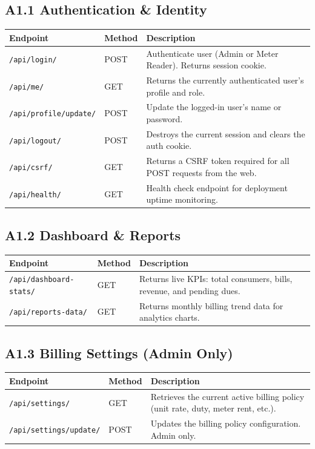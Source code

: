 \documentclass[12pt, a4paper, onecolumn]{report}
\begin{document}
\subsection*{A1.1 Authentication \& Identity}
\begin{tabularx}{\textwidth}{|p{5.2cm}|p{2.2cm}|X|}
\hline
\textbf{Endpoint} & \textbf{Method} & \textbf{Description} \\
\hline
\texttt{/api/login/} & POST & Authenticate user (Admin or Meter Reader). Returns session cookie. \\
\hline
\texttt{/api/me/} & GET & Returns the currently authenticated user's profile and role. \\
\hline
\texttt{/api/profile/update/} & POST & Update the logged-in user's name or password. \\
\hline
\texttt{/api/logout/} & POST & Destroys the current session and clears the auth cookie. \\
\hline
\texttt{/api/csrf/} & GET & Returns a CSRF token required for all POST requests from the web. \\
\hline
\texttt{/api/health/} & GET & Health check endpoint for deployment uptime monitoring. \\
\hline
\end{tabularx}

\vspace{0.8em}
\subsection*{A1.2 Dashboard \& Reports}
\begin{tabularx}{\textwidth}{|p{5.2cm}|p{2.2cm}|X|}
\hline
\textbf{Endpoint} & \textbf{Method} & \textbf{Description} \\
\hline
\texttt{/api/dashboard-stats/} & GET & Returns live KPIs: total consumers, bills, revenue, and pending dues. \\
\hline
\texttt{/api/reports-data/} & GET & Returns monthly billing trend data for analytics charts. \\
\hline
\end{tabularx}

\vspace{0.8em}
\subsection*{A1.3 Billing Settings (Admin Only)}
\begin{tabularx}{\textwidth}{|p{5.2cm}|p{2.2cm}|X|}
\hline
\textbf{Endpoint} & \textbf{Method} & \textbf{Description} \\
\hline
\texttt{/api/settings/} & GET & Retrieves the current active billing policy (unit rate, duty, meter rent, etc.). \\
\hline
\texttt{/api/settings/update/} & POST & Updates the billing policy configuration. Admin only. \\
\hline
\end{tabularx}
\end{document}
